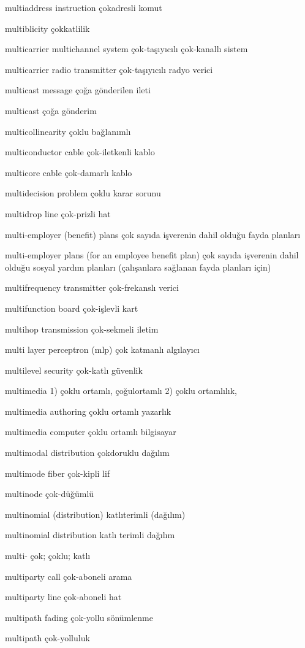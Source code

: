 \documentclass[12pt,fleqn]{article}\usepackage{../../common}
\begin{document}
multiaddress instruction çokadresli komut

multiblicity çokkatlilik

multicarrier multichannel system çok-taşıyıcılı çok-kanallı sistem

multicarrier radio transmitter çok-taşıyıcılı radyo verici

multicast message çoğa gönderilen ileti

multicast çoğa gönderim

multicollinearity çoklu bağlanımlı

multiconductor cable çok-iletkenli kablo

multicore cable çok-damarlı kablo

multidecision problem çoklu karar sorunu

multidrop line çok-prizli hat

multi-employer (benefit) plans çok sayıda işverenin dahil olduğu fayda planları

multi-employer plans (for an employee benefit plan) çok sayıda işverenin dahil olduğu sosyal yardım planları (çalışanlara sağlanan fayda planları için)

multifrequency transmitter çok-frekanslı verici

multifunction board çok-işlevli kart

multihop transmission çok-sekmeli iletim

multi layer perceptron (mlp) çok katmanlı algılayıcı

multilevel security çok-katlı güvenlik

multimedia 1) çoklu ortamlı, çoğulortamlı 2) çoklu ortamlılık,

multimedia authoring çoklu ortamlı yazarlık

multimedia computer çoklu ortamlı bilgisayar

multimodal distribution çokdoruklu dağılım

multimode fiber çok-kipli lif

multinode çok-düğümlü

multinomial (distribution) katlıterimli (dağılım)

multinomial distribution katlı terimli dağılım

multi- çok; çoklu; katlı

multiparty call çok-aboneli arama

multiparty line çok-aboneli hat

multipath fading çok-yollu sönümlenme

multipath çok-yolluluk
\end{document}
